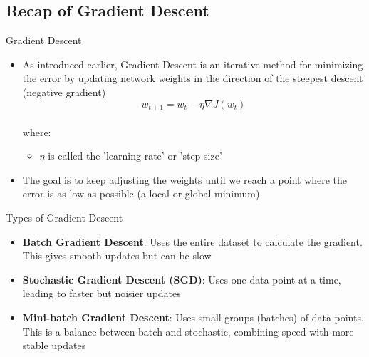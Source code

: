 \documentclass[serif, aspectratio=169]{beamer}
\begin{document}
\subsection{Recap of Gradient Descent}
\begin{frame}{Gradient Descent}
    \begin{itemize}
        \item As introduced earlier, Gradient Descent is an iterative method for minimizing the error by updating network weights in the direction of the steepest descent (negative gradient)
        \[w_{t+1} = w_t - \eta \nabla J(w_t)\]\\
        where:
        \begin{itemize}
            \item $\eta$ is called the 'learning rate' or 'step size'
        \end{itemize}
        \item The goal is to keep adjusting the weights until we reach a point where the error is as low as possible (a local or global minimum)
    \end{itemize}
\end{frame}

\begin{frame}{Types of Gradient Descent}
    \begin{itemize}
        \item \textbf{Batch Gradient Descent}: Uses the entire dataset to calculate the gradient. This gives smooth updates but can be slow
        \item \textbf{Stochastic Gradient Descent (SGD)}: Uses one data point at a time, leading to faster but noisier updates
        \item \textbf{Mini-batch Gradient Descent}: Uses small groups (batches) of data points. This is a balance between batch and stochastic, combining speed with more stable updates
    \end{itemize}
\end{frame}
\end{document}
